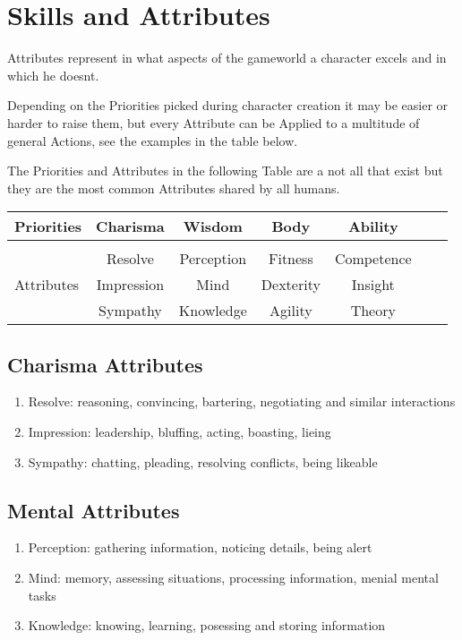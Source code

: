 \section{Skills and Attributes}\label{subsec:skillsAndAttributes}
Attributes represent in what aspects of the gameworld a character excels and in which he doesnt.\par
Depending on the Priorities picked during character creation it may be easier or harder to raise them, but every
Attribute can be Applied to a multitude of general Actions, see the examples in the table below.\par
The Priorities and Attributes in the following Table are a not all that exist
but they are the most common Attributes shared by all humans.\vspace{1cm}
\begin{tabular}{l||cccccc}
    Priorities      &Charisma      &Wisdom         &Body        &Ability    \\\hline\\
    &Resolve       &Perception     &Fitness     &Competence   \\
    Attributes      &Impression    &Mind           &Dexterity   &Insight   \\
    &Sympathy      &Knowledge      &Agility     &Theory   \\



\end{tabular}\vspace{1cm}
\subsection{Charisma Attributes}
\begin{enumerate}[label= -]
    \item {Resolve}: reasoning, convincing, bartering, negotiating and similar interactions
    \item {Impression}: leadership, bluffing, acting, boasting, lieing
    \item {Sympathy}: chatting, pleading, resolving conflicts, being likeable
\end{enumerate}
\subsection{Mental Attributes}
\begin{enumerate}[label=-]
    \item {Perception}: gathering information, noticing details, being alert
    \item {Mind}: memory, assessing situations, processing information, menial mental tasks
    \item {Knowledge}: knowing, learning, posessing and storing information
\end{enumerate}
